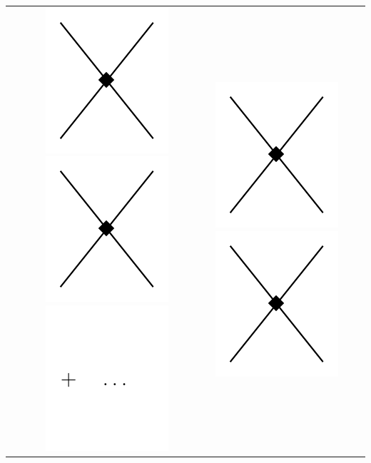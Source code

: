 \begin{table}
\begin{tabular}{ c | c | c | c }
{\includegraphics[scale=0.5,page=6]{Introduction/Figures/N3LO}
\includegraphics[scale=0.5,page=7]{Introduction/Figures/N3LO}
\includegraphics[scale=0.5,page=1]{Introduction/Figures/ellipsis} 
} &
\parbox[c][][c]{5.8cm}{\centering
\includegraphics[scale=0.5,page=8]{Introduction/Figures/N3LO}\hspace{.2cm}
\includegraphics[scale=0.5,page=9]{Introduction/Figures/N3LO}\hspace{.2cm}
}
\end{tabular}
\end{table}
